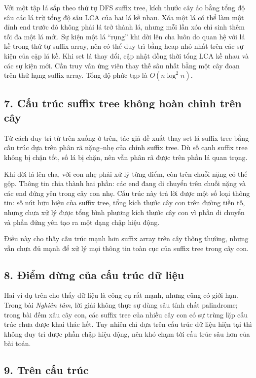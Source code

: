 \documentclass[11pt]{article}
\begin{document}
Với một tập lá sắp theo thứ tự DFS suffix tree, kích thước cây ảo bằng tổng độ
sâu các lá trừ tổng độ sâu LCA của hai lá kề nhau. Xóa một lá có thể làm một
đỉnh end trước đó không phải lá trở thành lá, nhưng mỗi lần xóa chỉ sinh thêm
tối đa một lá mới. Sự kiện một lá ``rụng'' khi dời lên cha luôn do quan hệ với
lá kề trong thứ tự suffix array, nên có thể duy trì bằng heap nhỏ nhất trên
các sự kiện của cặp lá kề. Khi set lá thay đổi, cập nhật đồng thời tổng LCA kề
nhau và các sự kiện mới. Cần truy vấn ứng viên thay thế sâu nhất bằng một cây
đoạn trên thứ hạng suffix array. Tổng độ phức tạp là \(O(n\log^2 n)\).

\subsection*{7. Cấu trúc suffix tree không hoàn chỉnh trên cây}

Từ cách duy trì từ trên xuống ở trên, tác giả đề xuất thay set lá suffix tree
bằng cấu trúc dựa trên phân rã nặng--nhẹ của chính suffix tree. Dù số cạnh
suffix tree không bị chặn tốt, số lá bị chặn, nên vẫn phân rã được trên phần
lá quan trọng.

Khi dời lá lên cha, với con nhẹ phải xử lý từng điểm, còn trên chuỗi nặng có
thể gộp. Thông tin chia thành hai phần: các end đang di chuyển trên chuỗi nặng
và các end đứng yên trong cây con nhẹ. Cấu trúc này trả lời được một số loại
thông tin: số nút hữu hiệu của suffix tree, tổng kích thước cây con trên đường
tiền tố, nhưng chưa xử lý được tổng bình phương kích thước cây con vì phần di
chuyển và phần đứng yên tạo ra một dạng chập hiệu động.

Điều này cho thấy cấu trúc mạnh hơn suffix array trên cây thông thường, nhưng
vẫn chưa đủ mạnh để xử lý mọi thông tin toàn cục của suffix tree trong cây con.

\subsection*{8. Điểm dừng của cấu trúc dữ liệu}

Hai ví dụ trên cho thấy dữ liệu là công cụ rất mạnh, nhưng cũng có giới hạn.
Trong bài \emph{Nghiên tâm}, lời giải không thực sự dùng sâu tính chất
palindrome; trong bài đếm xâu cây con, các suffix tree của nhiều cây con có
sự trùng lặp cấu trúc chưa được khai thác hết. Tuy nhiên chỉ dựa trên cấu trúc
dữ liệu hiện tại thì không duy trì được phần chập hiệu động, nên khó chạm tới
cấu trúc sâu hơn của bài toán.

\subsection*{9. Trên cấu trúc}
\end{document}
